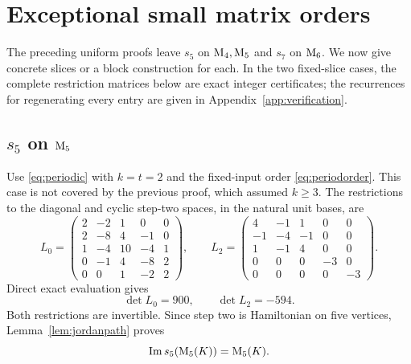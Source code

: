 \section{Exceptional small matrix orders}\label{sec:seams}
The preceding uniform proofs leave $s_5$ on $\mathrm{M}_4,\mathrm{M}_5$
and $s_7$ on $\mathrm{M}_6$. We now give concrete slices or a block
construction for each. In the two fixed-slice cases, the complete
restriction matrices below are exact integer certificates; the
recurrences for regenerating every entry are given in
Appendix~\ref{app:verification}.

\subsection{\texorpdfstring{$s_5$ on $\mathrm{M}_5$}{s5 on M5}}
Use \eqref{eq:periodic} with $k=t=2$ and the fixed-input order
\eqref{eq:periodorder}. This case is not covered by the previous
proof, which assumed $k\ge3$. The restrictions to the diagonal
and cyclic step-two spaces, in the natural unit bases, are
\begin{equation}\label{eq:s5mat}
L_0=\begin{pmatrix}
2&-2&1&0&0\\
2&-8&4&-1&0\\
1&-4&10&-4&1\\
0&-1&4&-8&2\\
0&0&1&-2&2
\end{pmatrix},\qquad
L_2=\begin{pmatrix}
4&-1&1&0&0\\
-1&-4&-1&0&0\\
1&-1&4&0&0\\
0&0&0&-3&0\\
0&0&0&0&-3
\end{pmatrix}.
\end{equation}
Direct exact evaluation gives
\begin{equation}\label{eq:s5dets}
 \det L_0=900,\qquad\det L_2=-594.
\end{equation}
Both restrictions are invertible. Since step two is Hamiltonian
on five vertices, Lemma~\ref{lem:jordanpath} proves
\begin{equation}\label{eq:s5m5}
 \operatorname{Im} s_5(\mathrm{M}_5(K))=\mathrm{M}_5(K).
\end{equation}

